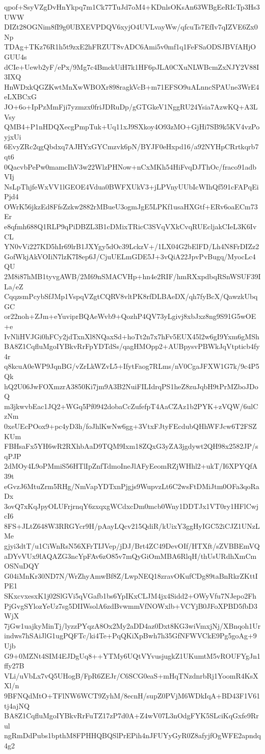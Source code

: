 qpof+SsyVZgDvHnYkpq7m1Ck77TuJd7oM4+KDnlsOKsAn63WBgEeRIcTp3Hs3UWW
DIZt28OGNim8fI9g0UBXEVPDQV6xyjO4UVLvayWw/qfcuTs7EfIv7qIZVE6Zx0Np
TDAg+TKz76R1h5t9zxE2hFRZUT8vADC6Ami5v0mf1q1FeFSaODSJBVfAHjOGUU4s
dCIe+Uewb2yF/ePx/9Mg7c4BmckUiH7k1HF6pJLA0CXuNLWBcmZxNJY2V88I3IXQ
HnWDxkQGZKwtMnXwWBOXr898ragkVcB+m71EFSO9uALnncSPAUne3WrE4eLXBCxG
JO+6o+IpPzMmFji7yzmzx0friJDRuDp/gGTGkeV1NggRU24Ysia7AzwKQ+A3LVsy
QMB4+P1nHDQXecgPmpTuk+Uq11xJ9SXkoy4O93zMO+GjHi7SB9k5KV4vzPoyjxUi
6EvyZRc2qgQbdxq7AJHYxGYCmzvk6pN/BYJF0eHxpd16/a92NYHpCRrtkqrb7qt6
0QacvbPePw0mamcIhV3w22WlzPHNow+nCxMKh54HiFvqDJThOc/fraco91adbVIj
NsLpThjfeWxVV1lGEOE4Vdua0BWFXUkV3+jLPVnyUUbIcWIhQf591cFAPqEiPjd4
OWrK56jkzEd8FfsZzkw2882rMBueU3ogmJgE5LPKf1usaHXGtf+ERv6oaECm73Er
e8qfmh688Q1RLP9qPiDBZL3B1cDMixTRicC3SVqVXkCvqRUEcljakCIeL3K6IvCL
YN0vVi227KD5hIr69lrB1JXYgy5dOc39LckzV+/1LX04G2bElFD/Lh4N8FrDIZz2
GofWkjAkVOIiN7lzK7I8ep6J/CjuUELmGDE5J+3vQiA22JpvPvBugq/MyocLc4QU
2M8i87hMB1tyvgAWB/2M69nSMACVHp+hn4e2RIF/hmRXxpdbqRSnWSUF39ILa/eZ
CqqzsmPcybSfJMp1VspqVZgtCQRV8vltPK8rfDLBAeDX/qh7fyBcX/QawzkUbqGC
or22noh+ZJm+eYuviprBQAeWvb9+QozhP4QV73yLgivj8xbJxz8ng9S91G5wOE+e
IvNliHVJGi0hFCy2jdTxnXl8NQaxSd+hoTt2n7x7hFv5EUX45l2w6gI9Yxm6gMSh
BA8Z1CqfluMgoIYBkvRrFpYDTdSs/qagHMOpp2+AUBpysvPBWkJqVtpticb4fy4r
q8kcuA0eWP9JqnBG/vZrLkWZvL5+IfytFaog7RLms/nV0CgaJFXW1G7k/9c4P5Qk
hQ2U06JwFOXmzrA3850Ki7jm9A3B2NuiFILIdrqPS1heZ8zuJqbH9tPrMZboJDoQ
m3jkwvbEac1JQ2+WGq5Pf0942dobaCcZufefpT4AaCZAz1b2PYK+zVQW/6ulCzNm
0xeUEcPOox9+pc4yD3h/foJhlKwNw6gg+3VtxFJtyFEcdubQHhWFJcw6T2FSZKUm
FBHsaFx5YH6wR2RXhbAaD9TQM9Ixm18ZQxG3yZA3jgdywt2QH98x2582JP/sqPJP
2dMOy4L9oPMmiS56HTlIpZnfTdmoIneJlAFyEeomRZjWHhl2+ukT/I6XPYQfA39t
eGvzJ6MtuZrm5RHg/NmVapYDTxnPjgjs9WupvzLt6C2wsFtDMiJtm0OFa3qoRaDx
3ovQ7xKqJpyOLUFrjrnqY6zxqxgWCdxcDm0mcb0Wny1DDTJx1VT0ry1HFlCwjcI6
8FS+JLtZ648W3RRGYcr9H/pAayLQcv215QdiR/kUixY3ggHyIGC52iCJZ1UNzLMe
gjyi3dtT/u1CiWnRsN56XFrTIJVep/jDJ/Brt4ZC49DevOIf/HTXft/sZVBBEmVQ
aDYvVUx9lAQAZG3ncYpFAv6zO85v7mQyGiOmMBA6RlqH/thUsURdhXmCmOSNuDQY
G04iMnKr30ND7N/WrZhyAmwBf8Z/LwpNEQ18zravOKufCDg89taBnRkrZKttIPE1
SKxcvxesxK1j02SlGVi5qVGafb1bs6YpIKxCLJM4jx4Sidd2+OWyVfu7NJepo2Fh
PjGvgSYlozYeUz7sg5DIIWsolA6zdBvwmmVfNOWxlb+VCYjB0JFoXPBD5fbD3WjX
7jGw1uajkyMinTj/lyzzPYqzA8Ox2My2aDD4az0Dxt8KG3wiVmxjNj/XBnqoh1Ur
indws7hSAiJlG1ugPQFTc/ki4Te+PqQKiXpBwh7h35GfNFWVCkE9Pg5goAg+9Ujb
G9+0MZNt4SIM4EJDgUq8++YTMy6UQtVYvusjugkZ1UKumtM5vROUFYgJn1ffy27B
VLi/uVbLx7vQ5UHogB/FpR6ZEJr/C6SCG0eaS+mHqTNzdnrbRj1YoomR4KsXXl/n
9BFNQdMtO+TFlNW6WCT9ZyhM/8ecnH/supZ0PVjM6WDkIqA+BD43F1V61tj4ajNQ
BA8Z1CqfluMgoIYBkvRrFuTZ17zP7d0A+Z4wV07L3nOdgFYK5SLciKqGxfe9Rrul
ngRmDdPubs1bpthM8FPHHQBQSlPrEPih4nJFUYyGyR0Z8afyjfOgWFE2apndq4g2
